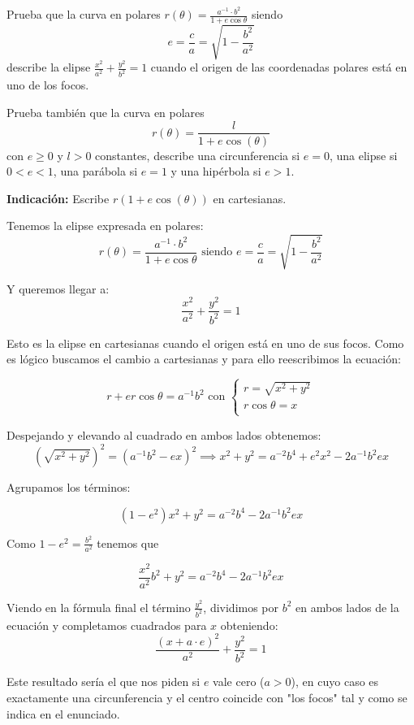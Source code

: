 \begin{problem}[3]
Prueba que la curva en polares $r(\theta)= \frac{a^{-1} \cdot b^2}{1 + e\cos\theta}$ siendo
\[ e = \frac{c}{a} = \sqrt{1 - \frac{b^2}{a^2}}\]
describe la elipse $\frac{x^2}{a^2} + \frac{y^2}{b^2} = 1$ cuando el origen de las coordenadas polares está en uno de los focos.

Prueba también que la curva en polares
\[r(\theta)=\frac{l}{1+e\cos(\theta)}\]
con $e \geq 0$ y $l>0$ constantes, describe una circunferencia si $e=0$, una elipse si $0<e<1$, una parábola si $e=1$ y una hipérbola si $e>1$.

\textbf{Indicación:} Escribe $r(1+e\cos(\theta))$ en cartesianas.

\solution

    Tenemos la elipse expresada en polares:$$r(\theta)= \frac{a^{-1} \cdot b^2}{1 + e\cos\theta} \text{  siendo  } e = \frac{c}{a} = \sqrt{1 - \frac{b^2}{a^2}}$$

    Y queremos llegar a: $$\frac{x^2}{a^2} + \frac{y^2}{b^2} = 1$$

    Esto es la elipse en cartesianas cuando el origen está en uno de sus focos. Como es lógico buscamos el cambio a cartesianas y para ello reescribimos la ecuación:

    $$ r + er\cos\theta = a^{-1} b^2 \text{ con }
    \begin{cases}
    r = \sqrt{x^2 + y^2}\\
    r\cos\theta = x\\
    \end{cases}$$

    Despejando y elevando al cuadrado en ambos lados obtenemos:
    \[(\sqrt{x^2 + y^2})^2 = (a^{-1}b^2 - ex)^2 \implies x^2 + y^2 = a^{-2} b^4 + e^2x^2 - 2a^{-1}b^2ex\]

    Agrupamos los términos:

    \[(1-e^2)x^2 + y^2 = a^{-2} b^4 - 2a^{-1}b^2ex\]


    Como $1-e^2 = \frac{b^2}{a^2}$ tenemos que

    $$\frac{x^2}{a^2}b^2 + y^2 = a^{-2} b^4 - 2a^{-1}b^2ex$$

    Viendo en la fórmula final el término $\frac{y^2}{b^2}$, dividimos por $b^2$ en ambos lados de la ecuación y completamos cuadrados para $x$ obteniendo:
    $$\frac{(x + a\cdot e)^2}{a^2} + \frac{y^2}{b^2} = 1$$

    Este resultado sería el que nos piden si $e$ vale cero ($a>0$), en cuyo caso es exactamente una circunferencia y el centro coincide con "los focos" tal y como se indica en el enunciado.
\end{problem}

